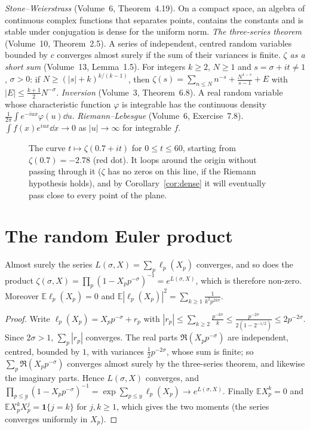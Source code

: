 \begin{reminder}
\emph{Stone--Weierstrass} (Volume~6, Theorem~4.19). On a compact space, an algebra of continuous complex functions that separates points, contains the constants and is stable under conjugation is dense for the uniform norm.
\emph{The three-series theorem} (Volume~10, Theorem~2.5). A series of independent, centred random variables bounded by $c$ converges almost surely if the sum of their variances is finite.
\emph{$\zeta$ as a short sum} (Volume~13, Lemma~1.5). For integers $k\ge2$, $N\ge1$ and $s=\sigma+it\ne1$, $\sigma>0$: if $N\ge(|s|+k)^{k/(k-1)}$, then $\zeta(s)=\sum_{n\le N}n^{-s}+\frac{N^{1-s}}{s-1}+E$ with $|E|\le\frac{k+1}2N^{-\sigma}$.
\emph{Inversion} (Volume~3, Theorem~6.8). A real random variable whose characteristic function $\varphi$ is integrable has the continuous density $\frac1{2\pi}\int e^{-iux}\varphi(u)\dd u$.
\emph{Riemann--Lebesgue} (Volume~6, Exercise~7.8). $\int f(x)e^{iux}\dd x\to0$ as $|u|\to\infty$ for integrable $f$.
\end{reminder}

\begin{figure}[ht]
\centering{}
\caption{The curve $t\mapsto\zeta(0.7+it)$ for $0\le t\le60$, starting from $\zeta(0.7)=-2.78$ (red dot). It loops around the origin without passing through it ($\zeta$ has no zeros on this line, if the Riemann hypothesis holds), and by Corollary~\ref{cor:dense} it will eventually pass close to every point of the plane.}
\label{fig:zetacurve}
\end{figure}

\section{The random Euler product}

\begin{proposition}\label{prop:randomeuler}
Almost surely the series $L(\sigma,X)=\sum_p\ell_p(X_p)$ converges, and so does the product $\zeta(\sigma,X)=\prod_p(1-X_pp^{-\sigma})^{-1}=e^{L(\sigma,X)}$, which is therefore non-zero. Moreover $\mathbb E\ell_p(X_p)=0$ and $\mathbb E|\ell_p(X_p)|^2=\sum_{k\ge1}\frac1{k^2p^{2k\sigma}}$.
\end{proposition}
\begin{proof}
Write $\ell_p(X_p)=X_pp^{-\sigma}+r_p$ with $|r_p|\le\sum_{k\ge2}\frac{p^{-k\sigma}}k\le\frac{p^{-2\sigma}}{2(1-2^{-1/2})}\le2p^{-2\sigma}$. Since $2\sigma>1$, $\sum_p|r_p|$ converges. The real parts $\Re(X_pp^{-\sigma})$ are independent, centred, bounded by $1$, with variances $\frac12p^{-2\sigma}$, whose sum is finite; so $\sum_p\Re(X_pp^{-\sigma})$ converges almost surely by the three-series theorem, and likewise the imaginary parts. Hence $L(\sigma,X)$ converges, and $\prod_{p\le y}(1-X_pp^{-\sigma})^{-1}=\exp\sum_{p\le y}\ell_p(X_p)\to e^{L(\sigma,X)}$. Finally $\mathbb EX_p^k=0$ and $\mathbb EX_p^k\overline{X_p^j}=\mathbf 1\{j=k\}$ for $j,k\ge1$, which gives the two moments (the series converges uniformly in $X_p$).
\end{proof}


